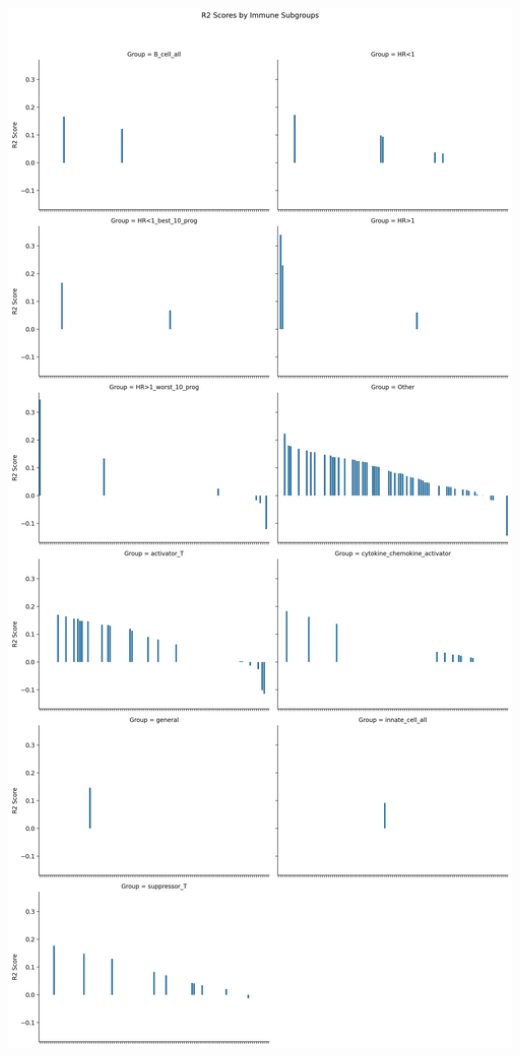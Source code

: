 \documentclass[
  letterpaper,
  DIV=11,
  numbers=noendperiod]{scrartcl}
\begin{document}
\includegraphics[width=12.38542in,height=25.55208in]{xgboost_tuned_files/figure-pdf/cell-48-output-1.png}
\end{document}
